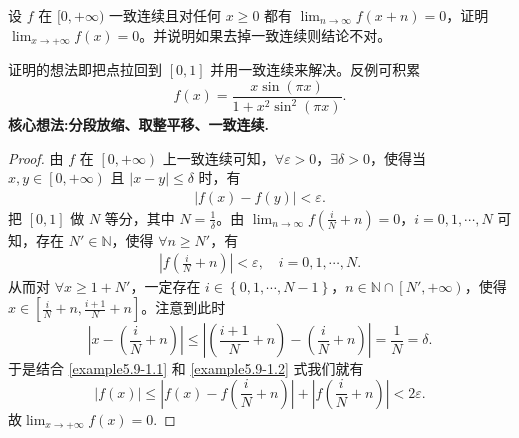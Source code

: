 \documentclass[../../main.tex]{subfiles}
\begin{document}
\begin{example}
设 \( f \) 在 \([0,+\infty)\) 一致连续且对任何 \( x \geqslant  0 \) 都有 \(\lim_{n \to \infty} f(x+n) = 0\)，证明 \(\lim_{x \to +\infty} f(x) = 0\)。并说明如果去掉一致连续则结论不对。
\end{example}
\begin{note}
证明的想法即把点拉回到 \([0,1]\) 并用一致连续来解决。反例可积累
\[
f(x) = \frac{x \sin (\pi x)}{1 + x^2 \sin^2 (\pi x)}.
\]
\textbf{核心想法:分段放缩、取整平移、一致连续.}
\end{note}
\begin{proof}
由 $f$ 在 $\left[ 0, +\infty \right)$ 上一致连续可知，$\forall \varepsilon > 0$，$\exists \delta > 0$，使得当 $x, y \in \left[ 0, +\infty \right)$ 且 $\left| x - y \right| \leqslant \delta$ 时，有
\begin{align}
\left| f\left( x \right) - f\left( y \right) \right| < \varepsilon. \label{example5.9-1.1}
\end{align}
把 $\left[ 0,1 \right]$ 做 $N$ 等分，其中 $N = \frac{1}{\delta}$。由 $\lim_{n \rightarrow \infty} f\left( \frac{i}{N} + n \right) = 0$，$i = 0, 1, \cdots, N$ 可知，存在 $N' \in \mathbb{N}$，使得 $\forall n \geqslant N'$，有
\begin{align}
\left| f\left( \frac{i}{N} + n \right) \right| < \varepsilon, \quad i = 0, 1, \cdots, N. \label{example5.9-1.2} 
\end{align}
从而对 $\forall x \geqslant 1 + N'$，一定存在 $i \in \left\{ 0, 1, \cdots, N - 1 \right\}$，$n \in \mathbb{N} \cap \left[ N', +\infty \right)$，使得 $x \in \left[ \frac{i}{N} + n, \frac{i + 1}{N} + n \right]$。注意到此时
\[
\left| x - \left( \frac{i}{N} + n \right) \right| \leqslant \left| \left( \frac{i + 1}{N} + n \right) - \left( \frac{i}{N} + n \right) \right| = \frac{1}{N} = \delta.
\]
于是结合 \eqref{example5.9-1.1} 和 \eqref{example5.9-1.2} 式我们就有
\[
\left| f\left( x \right) \right| \leqslant \left| f\left( x \right) - f\left( \frac{i}{N} + n \right) \right| + \left| f\left( \frac{i}{N} + n \right) \right| < 2\varepsilon.
\]
故\(\lim_{x \to +\infty} f(x) = 0\).
\end{proof}
\end{document}
